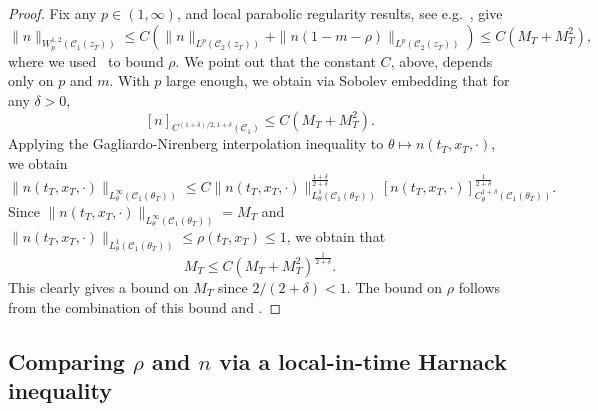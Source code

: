 \documentclass[11pt]{article}    %
\begin{document}
\begin{proof}
Fix any $p \in (1,\infty)$, and local parabolic regularity results, see e.g.~\cite[Theorem 7.22]{Lieberman}, give
\[
	\|n\|_{W^{1,2}_p\left( \mathcal{C}_1(z_T) \right)}
		\leq C\left( \|n\|_{L^p\left( \mathcal{C}_2(z_T) \right)} + \|n(1 - m -\rho)\|_{L^p\left( \mathcal{C}_2(z_T) \right)}\right)
		\leq C(M_T + M_T^2),
\]
where we used~ to bound $\rho$.  We point out that the constant $C$, above, depends only on $p$ and $m$.  
With $p$ large enough, we obtain via Sobolev embedding that for any $\delta > 0$,
\[
	[n]_{C^{(1+\delta)/2,1+\delta}(\mathcal{C}_1)} \leq C (M_T + M_T^2).
\]
Applying the Gagliardo-Nirenberg interpolation inequality to $\theta \mapsto n \left( t_T,x_T, \cdot \right)$, we obtain
\begin{equation*}
\| n \left( t_T,x_T, \cdot \right) \|_{L^\infty_\theta\left(\mathcal{C}_1(\theta_T)\right)} \leq C \| n \left( t_T,x_T, \cdot \right) \|_{L^1_\theta\left(\mathcal{C}_1(\theta_T)\right)}^{\frac{1+\delta}{2+\delta}} \left[ n \left( t_T,x_T, \cdot \right) \right]_{C^{1+\delta}_\theta\left(\mathcal{C}_1(\theta_T)\right)}^{\frac{1}{2+\delta}}.
\end{equation*}
Since $\| n \left( t_T,x_T, \cdot \right) \|_{L^\infty_\theta\left(\mathcal{C}_1(\theta_T)\right)} = M_T$ and $\| n \left( t_T,x_T, \cdot \right) \|_{L^1_\theta\left(\mathcal{C}_1(\theta_T)\right)} \leq \rho(t_T,x_T) \leq 1$, we obtain that
\begin{equation*}
M_T \leq C \left( M_T + M_T^2 \right)^{\frac{1}{2+\delta}}.
\end{equation*}
This clearly gives a bound on $M_T$ since $2/(2+\delta) < 1$.  The bound on $\rho$ follows from the combination of this bound and .
\end{proof}



\subsection{Comparing $\rho$ and $n$ via a local-in-time Harnack inequality}
\end{document}
